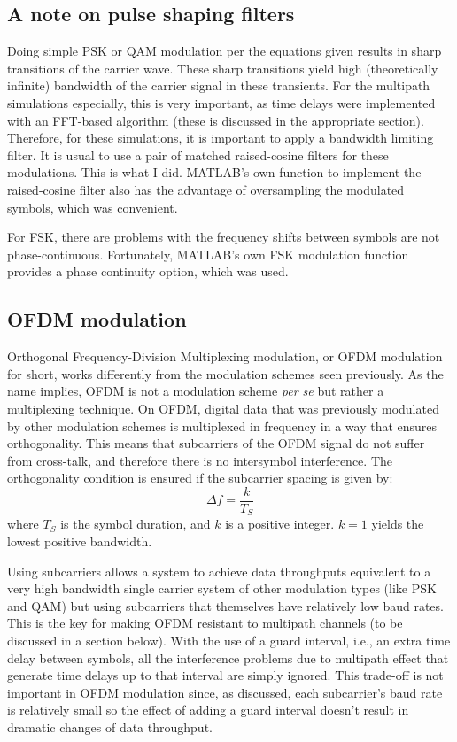 \subsection{A note on pulse shaping filters}

Doing simple PSK or QAM modulation per the equations given results in sharp
transitions of the carrier wave. These sharp transitions yield high (theoretically
infinite) bandwidth of the carrier signal in these transients. For the multipath
simulations especially, this is very important, as time delays were implemented
with an FFT-based algorithm (these is discussed in the appropriate section).
Therefore, for these simulations, it is important to apply a bandwidth limiting
filter. It is usual to use a pair of matched raised-cosine filters for these
modulations. This is what I did. MATLAB's own function to implement the
raised-cosine filter also has the advantage of oversampling the modulated symbols,
which was convenient.

For FSK, there are problems with the frequency shifts between symbols are not
phase-continuous. Fortunately, MATLAB's own FSK modulation function provides a
phase continuity option, which was used.

\subsection{OFDM modulation}

Orthogonal Frequency-Division Multiplexing modulation, or OFDM modulation for
short, works differently from the modulation schemes seen previously. As the name
implies, OFDM is not a modulation scheme \textit{per se} but rather a multiplexing
technique. On OFDM, digital data that was previously modulated by other modulation
schemes is multiplexed in frequency in a way that ensures orthogonality. This
means that subcarriers of the OFDM signal do not suffer from cross-talk, and
therefore there is no intersymbol interference. The orthogonality condition is
ensured if the subcarrier spacing is given by:
\begin{equation}
    \Delta f = \frac{k}{T_S}
    \label{eq:subspace}
\end{equation}
where \(T_S\) is the symbol duration, and \(k\) is a positive integer. \(k=1\)
yields the lowest positive bandwidth.

Using subcarriers allows a system to achieve data throughputs equivalent to a very
high bandwidth single carrier system of other modulation types (like PSK and QAM)
but using subcarriers that themselves have relatively low baud rates. This is the
key for making OFDM resistant to multipath channels (to be discussed in a section
below). With the use of a guard interval, i.e., an extra time delay between
symbols, all the interference problems due to multipath effect that generate time
delays up to that interval are simply ignored. This trade-off is not important in
OFDM modulation since, as discussed, each subcarrier's baud rate is relatively
small so the effect of adding a guard interval doesn't result in dramatic changes
of data throughput.

